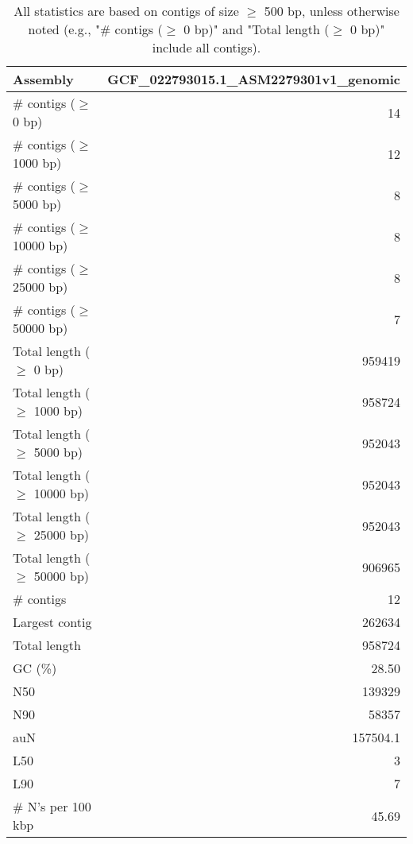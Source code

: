 \documentclass[12pt,a4paper]{article}
\begin{document}
\begin{table}[ht]
\begin{center}
\caption{All statistics are based on contigs of size $\geq$ 500 bp, unless otherwise noted (e.g., "\# contigs ($\geq$ 0 bp)" and "Total length ($\geq$ 0 bp)" include all contigs).}
\begin{tabular}{|l*{1}{|r}|}
\hline
Assembly & GCF\_022793015.1\_ASM2279301v1\_genomic \\ \hline
\# contigs ($\geq$ 0 bp) & 14 \\ \hline
\# contigs ($\geq$ 1000 bp) & 12 \\ \hline
\# contigs ($\geq$ 5000 bp) & 8 \\ \hline
\# contigs ($\geq$ 10000 bp) & 8 \\ \hline
\# contigs ($\geq$ 25000 bp) & 8 \\ \hline
\# contigs ($\geq$ 50000 bp) & 7 \\ \hline
Total length ($\geq$ 0 bp) & 959419 \\ \hline
Total length ($\geq$ 1000 bp) & 958724 \\ \hline
Total length ($\geq$ 5000 bp) & 952043 \\ \hline
Total length ($\geq$ 10000 bp) & 952043 \\ \hline
Total length ($\geq$ 25000 bp) & 952043 \\ \hline
Total length ($\geq$ 50000 bp) & 906965 \\ \hline
\# contigs & 12 \\ \hline
Largest contig & 262634 \\ \hline
Total length & 958724 \\ \hline
GC (\%) & 28.50 \\ \hline
N50 & 139329 \\ \hline
N90 & 58357 \\ \hline
auN & 157504.1 \\ \hline
L50 & 3 \\ \hline
L90 & 7 \\ \hline
\# N's per 100 kbp & 45.69 \\ \hline
\end{tabular}
\end{center}
\end{table}
\end{document}
